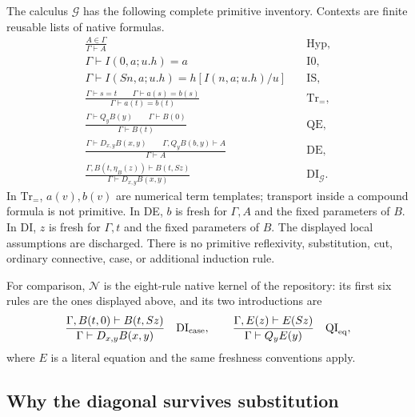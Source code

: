 The calculus $\mathcal G$ has the following complete primitive inventory.
Contexts are finite reusable lists of native formulas.
\begin{align*}
 \frac{A\in\Gamma}{\Gamma\vdash A}
   &\quad\text{Hyp},\\[3pt]
 \Gamma\vdash I(0,a;u.h)=a
   &\quad\text{I0},\\[3pt]
 \Gamma\vdash I(Sn,a;u.h)=h[I(n,a;u.h)/u]
   &\quad\text{IS},\\[3pt]
 \frac{\Gamma\vdash s=t\qquad
       \Gamma\vdash a(s)=b(s)}
      {\Gamma\vdash a(t)=b(t)}
   &\quad\text{Tr}_{=},\\[6pt]
 \frac{\Gamma\vdash Q_y B(y)\qquad\Gamma\vdash B(0)}
      {\Gamma\vdash B(t)}
   &\quad\text{QE},\\[6pt]
 \frac{\Gamma\vdash D_{x,y}B(x,y)\qquad
       \Gamma,Q_yB(b,y)\vdash A}
      {\Gamma\vdash A}
   &\quad\text{DE},\\[6pt]
 \frac{\Gamma,B(t,\eta_B(z))\vdash B(t,Sz)}
      {\Gamma\vdash D_{x,y}B(x,y)}
   &\quad\text{DI}_{\mathcal G}.
\end{align*}
In $\mathrm{Tr}_{=}$, $a(v),b(v)$ are numerical term templates; transport
inside a compound formula is not primitive.  In DE, $b$ is fresh for
$\Gamma,A$ and the fixed parameters of $B$.  In DI, $z$ is fresh for
$\Gamma,t$ and the fixed parameters of $B$.  The displayed local
assumptions are discharged.  There is no primitive reflexivity,
substitution, cut, ordinary connective, case, or additional induction
rule.

For comparison, $\mathcal N$ is the eight-rule native kernel of the
repository: its first six rules are the ones displayed above, and its two
introductions are
\begin{equation}
 \frac{\Gamma,B(t,0)\vdash B(t,Sz)}
      {\Gamma\vdash D_{x,y}B(x,y)}
 \quad\text{DI}_{\rm case},
 \qquad
 \frac{\Gamma,E(z)\vdash E(Sz)}
      {\Gamma\vdash Q_y E(y)}
 \quad\text{QI}_{\rm eq},
 \label{eq:diag-native-intros}
\end{equation}
where $E$ is a literal equation and the same freshness conventions apply.

\subsection{Why the diagonal survives substitution}

